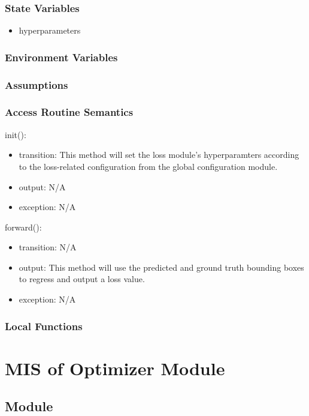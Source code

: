 \documentclass[12pt, titlepage]{article}
\begin{document}
\subsubsection{State Variables}

\begin{itemize}
  \item hyperparameters
\end{itemize}

\subsubsection{Environment Variables}

\subsubsection{Assumptions}

\subsubsection{Access Routine Semantics}
\noindent init():
\begin{itemize}
\item transition: This method will set the loss module's hyperparamters according to the loss-related configuration from the global configuration module. 
\item output: N/A
\item exception: N/A
\end{itemize}

\noindent forward():
\begin{itemize}
\item transition: N/A 
\item output: This method will use the predicted and ground truth bounding boxes to regress and output a loss value.
\item exception: N/A
\end{itemize}

\subsubsection{Local Functions}

\newpage

\section{MIS of Optimizer Module} \label{Module} 

\subsection{Module}
\end{document}
